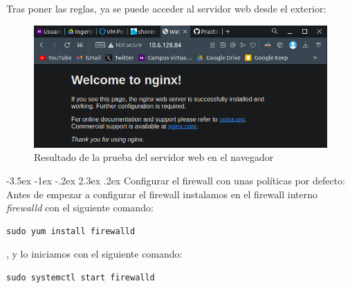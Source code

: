 \documentclass[11pt]{report}
\makeatletter
\renewcommand\chapter{\@startsection{chapter}{0}{\z@}%
    {-3.5ex \@plus -1ex \@minus -.2ex}%
    {2.3ex \@plus.2ex}%
    {\normalfont\Large\bfseries}}
\makeatother
\begin{document}
Tras poner las reglas, ya se puede acceder al servidor web desde el exterior:
\begin{figure}[H]
  \centering
  \includegraphics[scale=0.55]{img/nginx_navegador.png}
  \caption{Resultado de la prueba del servidor web en el navegador}
  \label{fig:resultado de la prueba del servidor web en el navegador}
\end{figure}

\cleardoublepage

\chapter{Configurar el firewall con unas políticas por defecto: }
Antes de empezar a configurar el firewall instalamos en el firewall interno \emph{firewalld} con el siguiente comando:
\begin{BVerbatim}
sudo yum install firewalld
\end{BVerbatim}
, y lo iniciamos con el siguiente comando: \\
\begin{BVerbatim}
sudo systemctl start firewalld
\end{BVerbatim}
\end{document}
